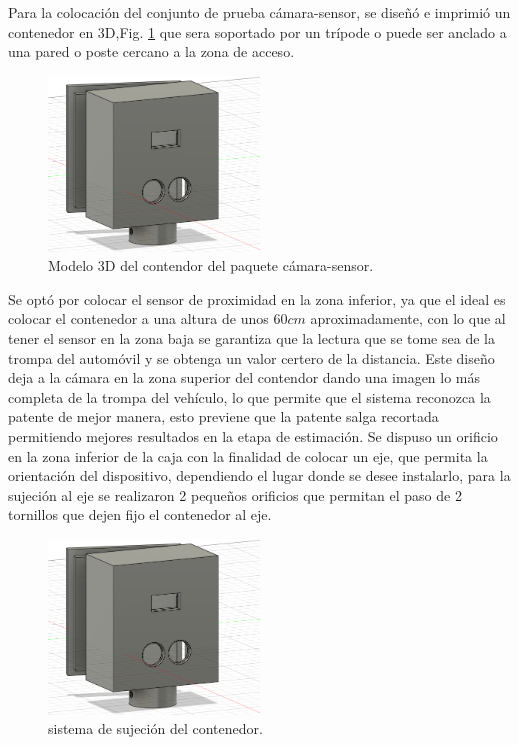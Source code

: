 Para la colocación del conjunto de prueba cámara-sensor, se diseñó e imprimió un contenedor en 3D,Fig. \ref{fig:contenedor-camara}
que sera soportado por un trípode o puede ser anclado a una pared o poste cercano a la zona de acceso.
\begin{figure}
    \centering
    \includegraphics[width=0.5\textwidth]{imgs/contenedor-camara.png}
    \caption{Modelo 3D del contendor del paquete cámara-sensor.}
    \label{fig:contenedor-camara}
\end{figure}

Se optó por colocar el sensor de proximidad en la zona inferior, ya que el ideal es colocar el contenedor a una altura de unos $60cm$ aproximadamente, con lo que al tener el sensor en la zona baja se garantiza que la lectura que se tome sea de la trompa del automóvil y se obtenga un valor certero de la distancia. Este diseño deja a la cámara en la zona superior del contendor dando una imagen lo más completa de la trompa del vehículo, lo que permite que el sistema reconozca la patente de mejor manera, esto previene que la patente salga recortada permitiendo mejores resultados en la etapa de estimación. Se dispuso un orificio en la zona inferior de la caja con la finalidad de colocar un eje, que permita la orientación del dispositivo, dependiendo
el lugar donde se desee instalarlo, para la sujeción al eje se realizaron 2 pequeños orificios que permitan el paso de 2 tornillos que dejen fijo
el contenedor al eje.
\begin{figure}
    \centering
    \includegraphics[width=0.5\textwidth]{imgs/contenedor-camara.png}
    \caption{sistema de sujeción del contenedor.}
    \label{fig:sujecion-contenedor}
\end{figure}

